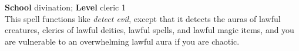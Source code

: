 \textbf{School} divination; \textbf{Level} cleric 1\\
This spell functions like \textit{detect evil}, except that it detects the auras of lawful creatures, clerics of lawful deities, lawful spells, and lawful magic items, and you are vulnerable to an overwhelming lawful aura if you are chaotic.\\
